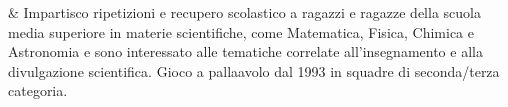 & Impartisco ripetizioni e recupero scolastico a ragazzi e ragazze della scuola media superiore in materie scientif\mbox{}iche, come Matematica, Fisica, Chimica e Astronomia e sono interessato alle tematiche correlate all'insegnamento e alla divulgazione scientif\mbox{}ica. Gioco a pallaavolo dal 1993 in squadre di seconda/terza categoria.\\